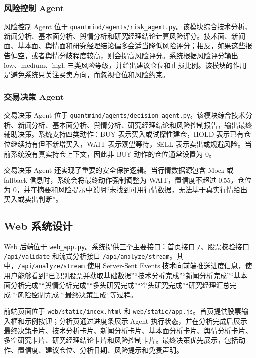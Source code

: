 \documentclass[UTF8,a4paper,12pt]{ctexart}
\begin{document}
\subsubsection{风险控制 Agent}

风险控制 Agent 位于 \texttt{quantmind/agents/risk\_agent.py}。该模块综合技术分析、新闻分析、基本面分析、舆情分析和研究经理结论计算风险评分。技术面、新闻面、基本面、舆情面和研究经理结论偏多会适当降低风险评分；相反，如果这些报告偏空，或者舆情分歧程度较高，则会提高风险评分。系统根据风险评分输出 low、medium、high 三类风险等级，并给出建议仓位和止损比例。该模块的作用是避免系统只关注买卖方向，而忽视仓位和风险约束。

\subsubsection{交易决策 Agent}

交易决策 Agent 位于 \texttt{quantmind/agents/decision\_agent.py}。该模块综合技术分析、新闻分析、基本面分析、舆情分析、研究经理结论和风险控制报告，输出最终辅助决策。系统支持四类动作：BUY 表示买入或试探性建仓，HOLD 表示已有仓位继续持有但不新增买入，WAIT 表示观望等待，SELL 表示卖出或规避风险。当前系统没有真实持仓上下文，因此非 BUY 动作的仓位通常设置为 0。

交易决策 Agent 还实现了重要的安全保护逻辑。当行情数据源包含 Mock 或 fallback 信息时，系统会将最终动作强制调整为 WAIT，置信度不超过 0.55，仓位为 0，并在摘要和风险提示中说明“未找到可用行情数据，无法基于真实行情给出买入或卖出判断”。

\subsection{Web 系统设计}

Web 后端位于 \texttt{web\_app.py}。系统提供三个主要接口：首页接口 \texttt{/}、股票校验接口 \texttt{/api/validate} 和流式分析接口 \texttt{/api/analyze/stream}。其中，\texttt{/api/analyze/stream} 使用 Server-Sent Events 技术向前端推送进度信息，使用户能够看到“已识别股票并获取基础数据”“技术分析完成”“新闻分析完成”“基本面分析完成”“舆情分析完成”“多头研究完成”“空头研究完成”“研究经理汇总完成”“风险控制完成”“最终决策生成”等过程。

前端页面位于 \texttt{web/static/index.html} 和 \texttt{web/static/app.js}。首页提供股票输入框和示例按钮；分析页通过进度条展示 Agent 执行状态，并在分析完成后展示最终决策卡片、技术分析卡片、新闻分析卡片、基本面分析卡片、舆情分析卡片、多空研究卡片、研究经理结论卡片和风险控制卡片。最终决策优先展示，包括动作、置信度、建议仓位、分析日期、风险提示和免责声明。
\end{document}
